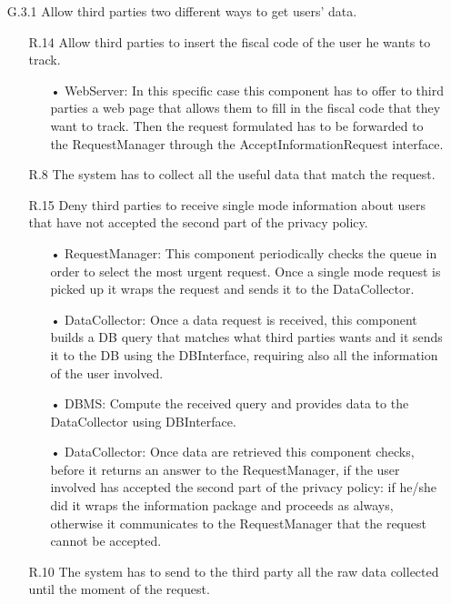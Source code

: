 \begin{enumerate}
\item [G.3.1] Allow third parties two different ways to get users’ data.
	\begin{enumerate}
	\item [R.14] Allow third parties to insert the fiscal code of the user he wants to track.
		\begin{enumerate}
		\item[•] WebServer: In this specific case this component has to offer to third parties a web page that allows them to fill in the fiscal code that they want to track. Then the request formulated has to be forwarded to the RequestManager through the AcceptInformationRequest interface.
		\end{enumerate}	
		
	\item [R.8] The system has to collect all the useful data that match the request.
	\item [R.15] Deny third parties to receive single mode information about users that have not accepted the second part of the privacy policy.
		\begin{enumerate}
		\item[•] RequestManager: This component periodically checks the queue in order to select the most urgent request. Once a single mode request is picked up it wraps the request and sends it to the DataCollector.
		\item[•] DataCollector: Once a data request is received, this component builds a DB query that matches what third parties wants and it sends it to the DB using the DBInterface, requiring also all the information of the user involved.
		\item[•] DBMS: Compute the received query and provides data to the DataCollector using DBInterface.
		\item[•] DataCollector: Once data are retrieved this component checks, before it returns an answer to the RequestManager, if the user involved has accepted the second part of the privacy policy: if he/she did it wraps the information package and proceeds as always, otherwise it communicates to the RequestManager that the request cannot be accepted.
		\end{enumerate}	
		
	\item [R.10] The system has to send to the third party all the raw data collected until the moment of the request.
	\end{enumerate}
	

\end{enumerate}
